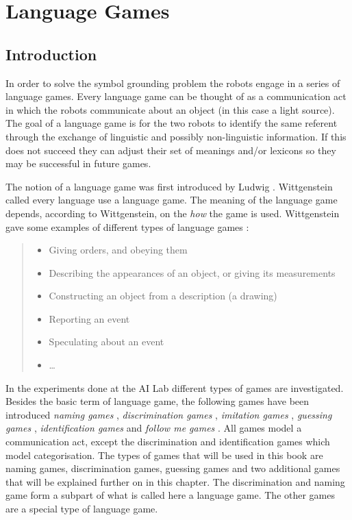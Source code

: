 \chapter{Language Games}\label{ch:lg}\label{ch:cm}

\section{Introduction}

In order to solve the symbol grounding problem the robots engage in a series of language games. Every language game can be thought of as a communication act in which the robots communicate about an object (in this case a light source). The goal of a language game is for the two robots to identify the same referent through the exchange of linguistic and possibly non-linguistic information. If this does not succeed they can adjust their set of meanings and/or lexicons so they may be successful in future games.


The notion of a language game was first introduced by Ludwig \citet{wittgenstein:1958}. Wittgenstein called every language use a language game. The meaning of the language game depends, according to Wittgenstein, on the {\em how} the game is used. Wittgenstein gave some examples of different types of language games \cite[p. 11, par. 22]{wittgenstein:1958}:

\begin{quote}
\begin{itemize}
\item Giving orders, and obeying them
\item Describing the appearances of an object, or giving its measurements
\item Constructing an object from a description (a drawing)
\item Reporting an event
\item Speculating about an event
\item \ldots 
\end{itemize}
\end{quote}

In the experiments done at the AI Lab different types of games are investigated. Besides the basic term of language game, the following games have been introduced {\em naming games} \citep{steels:1996a}, {\em discrimination games} \citep{steels:1996b}, {\em imitation games} \citep{deboer:1997}, {\em guessing games} \citep{steelskaplan:1999}, {\em identification games} and {\em follow me games} \citep{vogt:1999a,vogt:2000}. All games model a communication act, except the discrimination and identification games which model categorisation. The types of games that will be used in this book are naming games, discrimination games, guessing games and two additional games that will be explained further on in this chapter. The discrimination and naming game form a subpart of what is called here a language game. The other games are a special type of language game.

